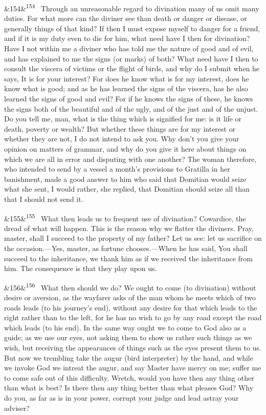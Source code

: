 \documentclass[12pt]{article}
\newcommand{\para}[1][]{\par\noindent\ifx&#1&\else\textsuperscript{\footnotesize #1}~\fi}
\begin{document}
\para[154] Through an unreasonable regard to divination many of us omit many duties. For what more can the diviner see than death or danger or disease, or generally things of that kind? If then I must expose myself to danger for a friend, and if it is my duty even to die for him, what need have I then for divination? Have I not within me a diviner who has told me the nature of good and of evil, and has explained to me the signs (or marks) of both? What need have I then to consult the viscera of victims or the flight of birds, and why do I submit when he says, It is for your interest? For does he know what is for my interest, does he know what is good; and as he has learned the signs of the viscera, has he also learned the signs of good and evil? For if he knows the signs of these, he knows the signs both of the beautiful and of the ugly, and of the just and of the unjust. Do you tell me, man, what is the thing which is signified for me: is it life or death, poverty or wealth? But whether these things are for my interest or whether they are not, I do not intend to ask you. Why don't you give your opinion on matters of grammar, and why do you give it here about things on which we are all in error and disputing with one another? The woman therefore, who intended to send by a vessel a month's provisions to Gratilla in her banishment, made a good answer to him who said that Domitian would seize what she sent, I would rather, she replied, that Domitian should seize all than that I should not send it.

\para[155] What then leads us to frequent use of divination? Cowardice, the dread of what will happen. This is the reason why we flatter the diviners. Pray, master, shall I succeed to the property of my father? Let us see: let us sacrifice on the occasion.—Yes, master, as fortune chooses.—When he has said, You shall succeed to the inheritance, we thank him as if we received the inheritance from him. The consequence is that they play upon us.

\para[156] What then should we do? We ought to come (to divination) without desire or aversion, as the wayfarer asks of the man whom he meets which of two roads leads (to his journey's end), without any desire for that which leads to the right rather than to the left, for he has no wish to go by any road except the road which leads (to his end). In the same way ought we to come to God also as a guide; as we use our eyes, not asking them to show us rather such things as we wish, but receiving the appearances of things such as the eyes present them to us. But now we trembling take the augur (bird interpreter) by the hand, and while we invoke God we intreat the augur, and say Master have mercy on me; suffer me to come safe out of this difficulty. Wretch, would you have then any thing other than what is best? Is there then any thing better than what pleases God? Why do you, as far as is in your power, corrupt your judge and lead astray your adviser?
\end{document}
